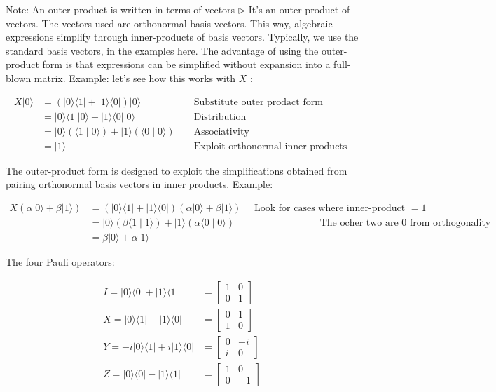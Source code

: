 \documentclass[main.tex]{subfiles}
\begin{document}
    Note: An outer-product is written in terms of vectors $\triangleright$ It's an outer-product of vectors. The vectors used are orthonormal basis vectors. This way, algebraic expressions simplify through inner-products of basis vectors. Typically, we use the standard basis vectors, in the examples here. The advantage of using the outer-product form is that expressions can be simplified without expansion into a full-blown matrix. Example: let's see how this works with $X$ :
    
    $$
    \begin{aligned}
    X|0\rangle &=(|0\rangle\langle 1|+| 1\rangle\langle 0|)|0\rangle & & \text { Substitute outer prodact form } \\
    &=|0\rangle\langle 1|| 0\rangle+|1\rangle\langle 0|| 0\rangle & & \text { Distribution } \\
    &=|0\rangle(\langle 1 \mid 0\rangle)+|1\rangle(\langle 0 \mid 0\rangle) & & \text { Associativity } \\
    &=|1\rangle & & \text { Exploit orthonormal inner products }
    \end{aligned}
    $$
    
    The outer-product form is designed to exploit the simplifications obtained from pairing orthonormal basis vectors in inner products. Example:
    
    $$
    \begin{array}{rlr}
    X(\alpha|0\rangle+\beta|1\rangle) & =(|0\rangle\langle 1|+| 1\rangle\langle 0|)(\alpha|0\rangle+\beta|1\rangle) \quad \text { Look for cases where inner-product }=1 \\
    & =|0\rangle(\beta\langle 1 \mid 1\rangle)+|1\rangle(\alpha\langle 0 \mid 0\rangle) & \text { The ocher two are } 0 \text { from orthogonality } \\
    & =\beta|0\rangle+\alpha|1\rangle
    \end{array}
    $$
    
    The four Pauli operators:
    
    $$
    \begin{aligned}
    I=|0\rangle\langle 0|+| 1\rangle\langle 1| &=\left[\begin{array}{ll}
    1 & 0 \\
    0 & 1
    \end{array}\right] \\
    X=|0\rangle\langle 1|+| 1\rangle\langle 0| &=\left[\begin{array}{ll}
    0 & 1 \\
    1 & 0
    \end{array}\right] \\
    Y=-i|0\rangle\langle 1|+i| 1\rangle\langle 0| &=\left[\begin{array}{cc}
    0 & -i \\
    i & 0
    \end{array}\right] \\
    Z=|0\rangle\langle 0|-| 1\rangle\langle 1| &=\left[\begin{array}{cc}
    1 & 0 \\
    0 & -1
    \end{array}\right]
    \end{aligned}
    $$
    
\end{document}
